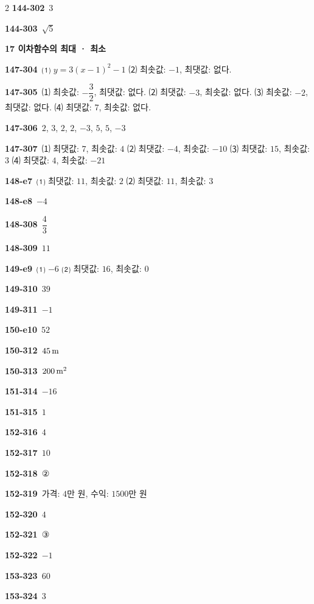 \documentclass[10pt,a4paper]{article}
\begin{document}
\begin{multicols}{2}
\noindent\textbf{144-302}\ $3$\par
\noindent\textbf{144-303}\ $\sqrt{5}$\par
\noindent\textbf{17 이차함수의 최대 · 최소}\par\smallskip
\noindent\textbf{147-304}\ ⑴ $y=3(x-1)^2-1$ ⑵ 최솟값: $-1$, 최댓값: 없다.\par
\noindent\textbf{147-305}\ ⑴ 최솟값: $-\dfrac{3}{2}$, 최댓값: 없다. ⑵ 최댓값: $-3$, 최솟값: 없다. ⑶ 최솟값: $-2$, 최댓값: 없다. ⑷ 최댓값: $7$, 최솟값: 없다.\par
\noindent\textbf{147-306}\ $2$, $3$, $2$, $2$, $-3$, $5$, $5$, $-3$\par
\noindent\textbf{147-307}\ ⑴ 최댓값: $7$, 최솟값: $4$ ⑵ 최댓값: $-4$, 최솟값: $-10$ ⑶ 최댓값: $15$, 최솟값: $3$ ⑷ 최댓값: $4$, 최솟값: $-21$\par
\noindent\textbf{148-e7}\ ⑴ 최댓값: $11$, 최솟값: $2$ ⑵ 최댓값: $11$, 최솟값: $3$\par
\noindent\textbf{148-e8}\ $-4$\par
\noindent\textbf{148-308}\ $\dfrac{4}{3}$\par
\noindent\textbf{148-309}\ $11$\par
\noindent\textbf{149-e9}\ ⑴ $-6$ ⑵ 최댓값: $16$, 최솟값: $0$\par
\noindent\textbf{149-310}\ $39$\par
\noindent\textbf{149-311}\ $-1$\par
\noindent\textbf{150-e10}\ $52$\par
\noindent\textbf{150-312}\ $45\mkern3mu \mathrm{m}$\par
\noindent\textbf{150-313}\ $200\mkern3mu \mathrm{m}^2$\par
\noindent\textbf{151-314}\ $-16$\par
\noindent\textbf{151-315}\ $1$\par
\noindent\textbf{152-316}\ $4$\par
\noindent\textbf{152-317}\ $10$\par
\noindent\textbf{152-318}\ ②\par
\noindent\textbf{152-319}\ 가격: $4$만 원, 수익: $1500$만 원\par
\noindent\textbf{152-320}\ $4$\par
\noindent\textbf{152-321}\ ③\par
\noindent\textbf{152-322}\ $-1$\par
\noindent\textbf{153-323}\ $60$\par
\noindent\textbf{153-324}\ $3$\par

\end{multicols}
\end{document}
